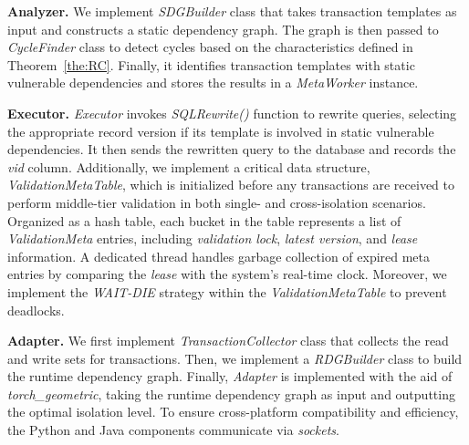 
\noindent\textbf{Analyzer.} We implement \textit{SDGBuilder} class that takes transaction templates as input and constructs a static dependency graph. The graph is then passed to \textit{CycleFinder} class to detect cycles based on the characteristics defined in Theorem~\ref{the:RC}. Finally, it identifies transaction templates with static vulnerable dependencies and stores the results in a \textit{MetaWorker} instance.

\noindent\textbf{Executor.} 
\textit{Executor} invokes \textit{SQLRewrite()} function to rewrite queries, selecting the appropriate record version if its template is involved in static vulnerable dependencies. It then sends the rewritten query to the database and records the \textit{vid} column.
Additionally, we implement a critical data structure, \textit{ValidationMetaTable}, which is initialized before any transactions are received to perform middle-tier validation in both single- and cross-isolation scenarios. Organized as a hash table, each bucket in the table represents a list of \textit{ValidationMeta} entries, including \textit{validation lock}, \textit{latest version}, and \textit{lease} information.
A dedicated thread handles garbage collection of expired meta entries by comparing the \textit{lease} with the system's real-time clock. Moreover, we implement the \textit{WAIT-DIE} strategy within the \textit{ValidationMetaTable} to prevent deadlocks.

\noindent\textbf{Adapter.} 
We first implement \textit{TransactionCollector} class that collects the read and write sets for transactions. Then, we implement a {\it RDGBuilder} class to build the runtime dependency graph. Finally, {\it Adapter} is implemented with the aid of \textit{torch\_geometric}, taking the runtime dependency graph as input and outputting the optimal isolation level.
To ensure cross-platform compatibility and efficiency, the Python and Java components communicate via \textit{sockets}. 